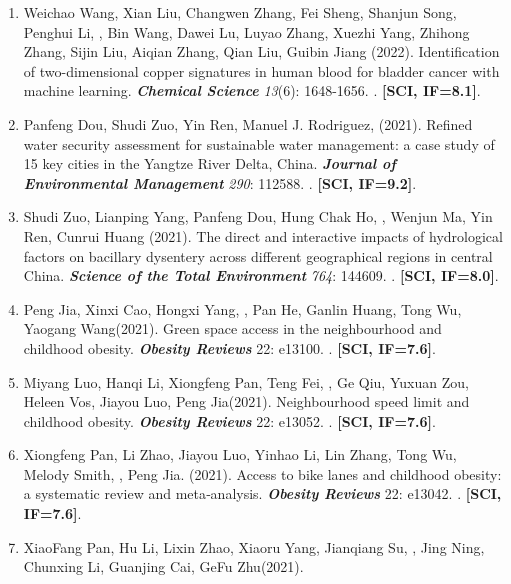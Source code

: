 \begin{enumerate}
    \textbf{\textit{Journal of Industrial Ecology}} \textit{26}(3): 1051-1060.
    . \textbf{[SCI, IF=5.7]}.
\item
    Weichao Wang\CF, Xian Liu\CF, Changwen Zhang, Fei Sheng, Shanjun Song, Penghui Li, \Shaoqing, Bin Wang, Dawei Lu, Luyao Zhang, Xuezhi Yang, Zhihong Zhang, Sijin Liu, Aiqian Zhang, Qian Liu\CS, Guibin Jiang (2022).
    Identification of two-dimensional copper signatures in human blood for bladder cancer with machine learning.
    \textbf{\textit{Chemical Science}} \textit{13}(6): 1648-1656.
    . \textbf{[SCI, IF=8.1]}.
\item
    Panfeng Dou, Shudi Zuo\CS, Yin Ren\CS, Manuel J. Rodriguez, \Shaoqing \enspace (2021).
    Refined water security assessment for sustainable water management: a case study of 15 key cities in the Yangtze River Delta, China.
    \textbf{\textit{Journal of Environmental Management}} \textit{290}: 112588.
    . \textbf{[SCI, IF=9.2]}.
\item
    Shudi Zuo, Lianping Yang\CS, Panfeng Dou, Hung Chak Ho, \Shaoqing, Wenjun Ma, Yin Ren, Cunrui Huang (2021).
    The direct and interactive impacts of hydrological factors on bacillary dysentery across different geographical regions in central China.
    \textbf{\textit{Science of the Total Environment}} \textit{764}: 144609.
    . \textbf{[SCI, IF=8.0]}.
\item
    Peng Jia\CF, Xinxi Cao\CF, Hongxi Yang, \Shaoqing, Pan He, Ganlin Huang, Tong Wu, Yaogang Wang\CS (2021).
    Green space access in the neighbourhood and childhood obesity.
    \textbf{\textit{Obesity Reviews}} 22: e13100.
    . \textbf{[SCI, IF=7.6]}.
\item
    Miyang Luo, Hanqi Li, Xiongfeng Pan, Teng Fei, \Shaoqing, Ge Qiu, Yuxuan Zou, Heleen Vos, Jiayou Luo, Peng Jia\CS (2021).
    Neighbourhood speed limit and childhood obesity.
    \textbf{\textit{Obesity Reviews}} 22: e13052.
    . \textbf{[SCI, IF=7.6]}.
\item
    Xiongfeng Pan, Li Zhao, Jiayou Luo, Yinhao Li, Lin Zhang, Tong Wu, Melody Smith, \Shaoqing, Peng Jia\CS. (2021).
    Access to bike lanes and childhood obesity: a systematic review and meta‐analysis.
    \textbf{\textit{Obesity Reviews}} 22: e13042.
    . \textbf{[SCI, IF=7.6]}.
\item
    XiaoFang Pan, Hu Li, Lixin Zhao, Xiaoru Yang, Jianqiang Su, \Shaoqing, Jing Ning, Chunxing Li, Guanjing Cai, GeFu Zhu\CS (2021).

\end{enumerate}
